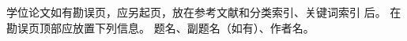 \begin{errata}
    学位论文如有勘误页，应另起页，放在参考文献和分类索引、关键词索引
    后。
    在勘误页顶部应放置下列信息。
    题名、副题名（如有）、作者名。
\end{errata}
